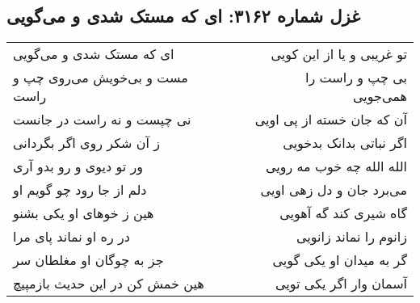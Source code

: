 \begin{center}
\section*{غزل شماره ۳۱۶۲: ای که مستک شدی و می‌گویی}
\label{sec:3162}
\begin{longtable}{l p{0.5cm} r}
ای که مستک شدی و می‌گویی
&&
تو غریبی و یا از این کویی
\\
مست و بی‌خویش می‌روی چپ و راست
&&
بی چپ و راست را همی‌جویی
\\
نی چپست و نه راست در جانست
&&
آن که جان خسته از پی اویی
\\
ز آن شکر روی اگر بگردانی
&&
اگر نباتی بدانک بدخویی
\\
ور تو دیوی و رو بدو آری
&&
الله الله چه خوب مه رویی
\\
دلم از جا رود چو گویم او
&&
می‌برد جان و دل زهی اویی
\\
هین ز خوهای او یکی بشنو
&&
گاه شیری کند گه آهویی
\\
در ره او نماند پای مرا
&&
زانوم را نماند زانویی
\\
جز به چوگان او مغلطان سر
&&
گر به میدان او یکی گویی
\\
هین خمش کن در این حدیث بازمپیچ
&&
آسمان وار اگر یکی تویی
\\
\end{longtable}
\end{center}
